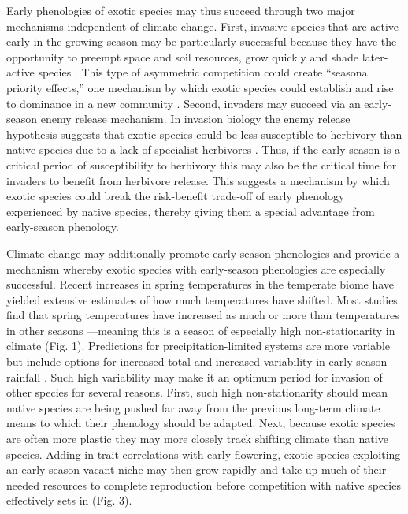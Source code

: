 \documentclass[11pt,a4paper,oneside]{article}
\begin{document}
Early phenologies of exotic species may thus succeed through two major mechanisms independent of climate change. First, invasive species that are active early in the growing season may be particularly successful because they have the opportunity to preempt space and soil resources, grow quickly and shade later-active species \citep{Weiner1990,Wilsey:2011cr,wolkovich:2010fee}. This type of asymmetric competition could create ``seasonal priority effects,'' one mechanism by which exotic species could establish and rise to dominance in a new community \citep{dickson2012,Wainwright:2012tw}. Second, invaders may succeed via an early-season enemy release mechanism. In invasion biology the enemy release hypothesis suggests that exotic species could be less susceptible to herbivory than native species due to a lack of specialist herbivores \citep{Keane:2002uz,Liu:2006kj}. Thus, if the early season is a critical period of susceptibility to herbivory this may also be the critical time for invaders to benefit from herbivore release. This suggests a mechanism by which exotic species could break the risk-benefit trade-off of early phenology experienced by native species, thereby giving them a special advantage from early-season phenology.

Climate change may additionally promote early-season phenologies and provide a mechanism whereby exotic species with early-season phenologies are especially successful. Recent increases in spring temperatures in the temperate biome \citep[at least partially associated with increases in greenhouse gases, see][]{Trenberth:2007hk} have yielded extensive estimates of how much temperatures have shifted. Most studies find that spring temperatures have increased as much or more than temperatures in other seasons \citep{cohen2012}---meaning this is a season of especially high non-stationarity in climate (Fig. 1). Predictions for precipitation-limited systems are more variable but include options for increased total and increased variability in early-season rainfall \citep{Trenberth:2007hk,knutti2013}. Such high variability may make it an optimum period for invasion of other species for several reasons. First, such high non-stationarity should mean native species are being pushed far away from the previous long-term climate means to which their phenology should be adapted. Next, because exotic species are often more plastic they may more closely track shifting climate than native species. Adding in trait correlations with early-flowering, exotic species exploiting an early-season vacant niche may then grow rapidly and take up much of their needed resources to complete reproduction before competition with native species effectively sets in (Fig. 3). \\
\end{document}
